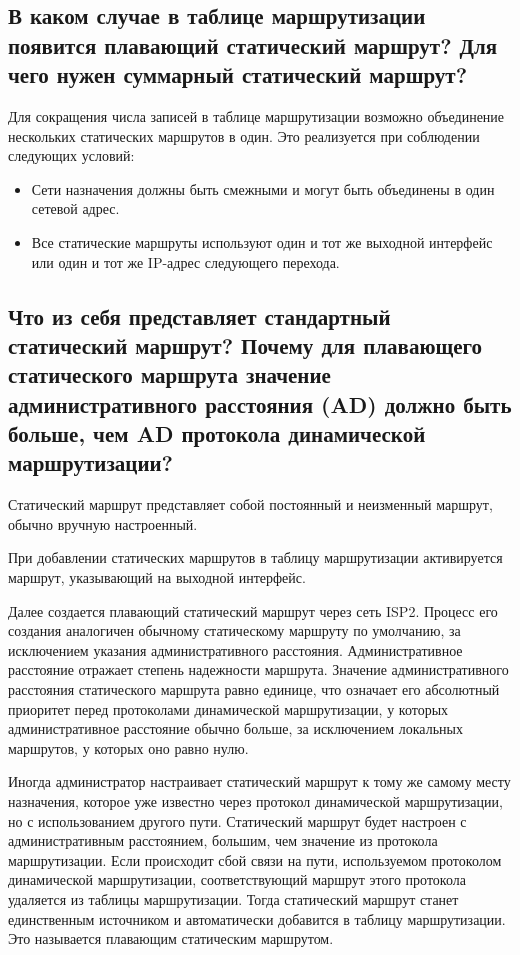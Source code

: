 \subsection{В каком случае в таблице маршрутизации появится
плавающий статический маршрут?
Для чего нужен суммарный статический маршрут?}

Для сокращения числа записей в таблице маршрутизации возможно
объединение нескольких статических маршрутов в один.
Это реализуется при соблюдении следующих условий:

\begin{itemize}
    \item Сети назначения должны быть смежными и могут быть объединены
    в один сетевой адрес.
    \item Все статические маршруты используют один
    и тот же выходной интерфейс или один
    и тот же IP-адрес следующего перехода.
\end{itemize}

\subsection{Что из себя представляет стандартный статический маршрут?
Почему для плавающего статического маршрута значение
административного расстояния (AD) должно быть больше,
    чем AD протокола динамической маршрутизации?}

Статический маршрут представляет собой постоянный и неизменный маршрут,
обычно вручную настроенный.\par
При добавлении статических маршрутов
в таблицу маршрутизации активируется маршрут,
указывающий на выходной интерфейс.\par
Далее создается плавающий статический маршрут через сеть ISP2.
Процесс его создания аналогичен обычному статическому маршруту по умолчанию,
за исключением указания административного расстояния.
Административное расстояние отражает степень надежности маршрута.
Значение административного расстояния статического маршрута равно единице,
что означает его абсолютный приоритет перед протоколами
динамической маршрутизации, у которых административное расстояние
обычно больше, за исключением локальных маршрутов,
у которых оно равно нулю.\par
Иногда администратор настраивает статический маршрут
к тому же самому месту назначения, которое уже известно
через протокол динамической маршрутизации, но с использованием другого пути.
Статический маршрут будет настроен с административным расстоянием, большим,
чем значение из протокола маршрутизации.
Если происходит сбой связи на пути, используемом протоколом динамической
маршрутизации, соответствующий маршрут этого протокола удаляется
из таблицы маршрутизации. Тогда статический маршрут станет единственным
источником и автоматически добавится в таблицу маршрутизации.
Это называется плавающим статическим маршрутом.

